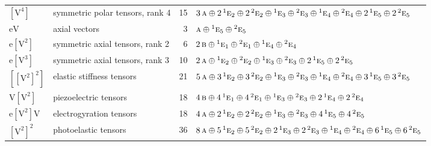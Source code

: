 \documentclass[10pt,a4paper]{article}
\numberwithin{equation}{section}
\newcommand{\irr}[1]{\text{\normalfont\scshape #1}}
\newcommand{\conjpair}[1]{{}^{#1}}
\newcommand{\jahn}[1]{\mathrm{#1}}
\newlength{\fillwidth}\newlength{\cellwidth}\newlength{\colwidth}
\begin{document}
{\begin{longtable}{@{}llr>{\RaggedRight\arraybackslash}p{\fillwidth}@{}}
$\jahn{[V^{4}]}$ & symmetric polar tensors, rank 4 & 15 & $3\,\irr{a} \oplus\allowbreak 2\,\conjpair{1}\irr{e}_{2} \oplus\allowbreak 2\,\conjpair{2}\irr{e}_{2} \oplus\allowbreak \conjpair{1}\irr{e}_{3} \oplus\allowbreak \conjpair{2}\irr{e}_{3} \oplus\allowbreak \conjpair{1}\irr{e}_{4} \oplus\allowbreak \conjpair{2}\irr{e}_{4} \oplus\allowbreak 2\,\conjpair{1}\irr{e}_{5} \oplus\allowbreak 2\,\conjpair{2}\irr{e}_{5}$\\
$\jahn{eV}$ & axial vectors & 3 & $\irr{a} \oplus\allowbreak \conjpair{1}\irr{e}_{5} \oplus\allowbreak \conjpair{2}\irr{e}_{5}$\\
$\jahn{e[V^{2}]}$ & symmetric axial tensors, rank 2 & 6 & $2\,\irr{b} \oplus\allowbreak \conjpair{1}\irr{e}_{1} \oplus\allowbreak \conjpair{2}\irr{e}_{1} \oplus\allowbreak \conjpair{1}\irr{e}_{4} \oplus\allowbreak \conjpair{2}\irr{e}_{4}$\\
$\jahn{e[V^{3}]}$ & symmetric axial tensors, rank 3 & 10 & $2\,\irr{a} \oplus\allowbreak \conjpair{1}\irr{e}_{2} \oplus\allowbreak \conjpair{2}\irr{e}_{2} \oplus\allowbreak \conjpair{1}\irr{e}_{3} \oplus\allowbreak \conjpair{2}\irr{e}_{3} \oplus\allowbreak 2\,\conjpair{1}\irr{e}_{5} \oplus\allowbreak 2\,\conjpair{2}\irr{e}_{5}$\\
$\jahn{[[V^{2}]^{2}]}$ & elastic stiffness tensors & 21 & $5\,\irr{a} \oplus\allowbreak 3\,\conjpair{1}\irr{e}_{2} \oplus\allowbreak 3\,\conjpair{2}\irr{e}_{2} \oplus\allowbreak \conjpair{1}\irr{e}_{3} \oplus\allowbreak \conjpair{2}\irr{e}_{3} \oplus\allowbreak \conjpair{1}\irr{e}_{4} \oplus\allowbreak \conjpair{2}\irr{e}_{4} \oplus\allowbreak 3\,\conjpair{1}\irr{e}_{5} \oplus\allowbreak 3\,\conjpair{2}\irr{e}_{5}$\\
$\jahn{V[V^{2}]}$ & piezoelectric tensors & 18 & $4\,\irr{b} \oplus\allowbreak 4\,\conjpair{1}\irr{e}_{1} \oplus\allowbreak 4\,\conjpair{2}\irr{e}_{1} \oplus\allowbreak \conjpair{1}\irr{e}_{3} \oplus\allowbreak \conjpair{2}\irr{e}_{3} \oplus\allowbreak 2\,\conjpair{1}\irr{e}_{4} \oplus\allowbreak 2\,\conjpair{2}\irr{e}_{4}$\\
$\jahn{e[V^{2}]V}$ & electrogyration tensors & 18 & $4\,\irr{a} \oplus\allowbreak 2\,\conjpair{1}\irr{e}_{2} \oplus\allowbreak 2\,\conjpair{2}\irr{e}_{2} \oplus\allowbreak \conjpair{1}\irr{e}_{3} \oplus\allowbreak \conjpair{2}\irr{e}_{3} \oplus\allowbreak 4\,\conjpair{1}\irr{e}_{5} \oplus\allowbreak 4\,\conjpair{2}\irr{e}_{5}$\\
$\jahn{[V^{2}]^{2}}$ & photoelastic tensors & 36 & $8\,\irr{a} \oplus\allowbreak 5\,\conjpair{1}\irr{e}_{2} \oplus\allowbreak 5\,\conjpair{2}\irr{e}_{2} \oplus\allowbreak 2\,\conjpair{1}\irr{e}_{3} \oplus\allowbreak 2\,\conjpair{2}\irr{e}_{3} \oplus\allowbreak \conjpair{1}\irr{e}_{4} \oplus\allowbreak \conjpair{2}\irr{e}_{4} \oplus\allowbreak 6\,\conjpair{1}\irr{e}_{5} \oplus\allowbreak 6\,\conjpair{2}\irr{e}_{5}$\\

\end{longtable}}
\end{document}
